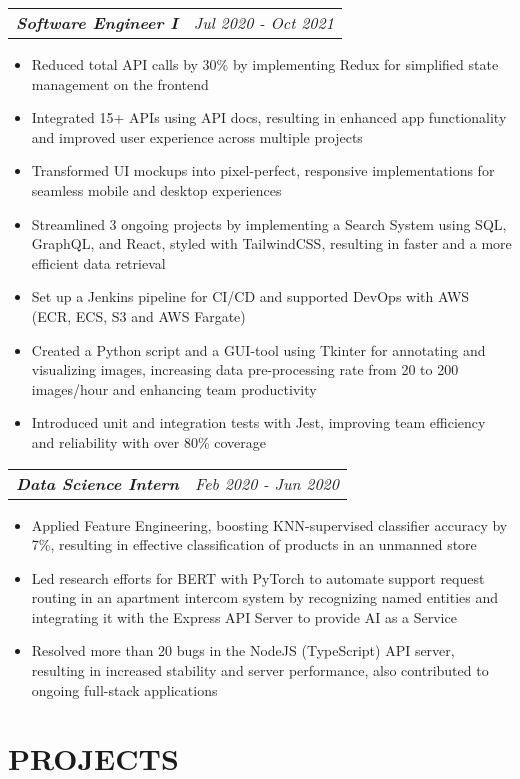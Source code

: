 \documentclass[letterpaper]{article}
\makeatletter
\newcommand{\resumeItemWithoutTitle}[1]{
  \item{
    {#1 \vspace{-4pt}}
  }
}
\newcommand{\resumeSubheadingWithoutTitle}[2]{
  \begin{tabular*}{\textwidth}{l@{\extracolsep{\fill}}r}
        \textbf{\textit{#1}} & \textit{ #2} \\
    \end{tabular*}\vspace{-15pt}
}
\newcommand{\shortSection}[1]{
    \vspace{-6pt}
    \section{#1}
}
\newcommand{\projectHeading}[4]{
  \begin{tabular*}{\textwidth}{l@{\extracolsep{\fill}}r}
        \textbf{#1} 
        \hspace{-2pt} $\vert$ \hspace{-2pt} {\textit{#2}} 
        \hspace{-2pt} $\vert$ \hspace{-2pt} \href{#3}{ \underline{Link}}
        &
        \textit{#4} \\
    \end{tabular*}\vspace{-2pt}
}
\newcommand{\resumeItemListStart}{\begin{itemize}}
\newcommand{\resumeItemListEnd}{\end{itemize}}
\makeatother
\begin{document}
\vspace{2pt}
\resumeSubheadingWithoutTitle
{Software Engineer I}{Jul 2020 - Oct 2021}
\vspace{0pt}
\resumeItemListStart
\resumeItemWithoutTitle{Reduced total API calls by 30\% by implementing Redux for simplified state management on the frontend}
\resumeItemWithoutTitle{Integrated 15+ APIs using API docs, resulting in enhanced app functionality and improved user experience across multiple projects}
\resumeItemWithoutTitle{Transformed UI mockups into pixel-perfect, responsive implementations for seamless mobile and desktop experiences}
\resumeItemWithoutTitle{Streamlined 3 ongoing projects by implementing a Search System using SQL, GraphQL, and React, styled with TailwindCSS, resulting in faster and a more efficient data retrieval}
\resumeItemWithoutTitle{Set up a Jenkins pipeline for CI/CD and supported DevOps with AWS (ECR, ECS, S3 and AWS Fargate)}
\resumeItemWithoutTitle{Created a Python script and a GUI-tool using Tkinter for annotating and visualizing images, increasing data pre-processing rate from 20 to 200 images/hour and enhancing team productivity}
\resumeItemWithoutTitle{Introduced unit and integration tests with Jest, improving team efficiency and reliability with over 80\% coverage}
\resumeItemListEnd

\vspace{2pt}
\resumeSubheadingWithoutTitle
{Data Science Intern}{Feb 2020 - Jun 2020}
\vspace{0pt}
\resumeItemListStart
\resumeItemWithoutTitle{Applied Feature Engineering, boosting KNN-supervised classifier accuracy by 7\%, resulting in effective classification of products in an unmanned store}
\resumeItemWithoutTitle{Led research efforts for BERT with PyTorch to automate support request routing in an apartment intercom system by recognizing named entities and integrating it with the Express API Server to provide AI as a Service}
\resumeItemWithoutTitle{Resolved more than 20 bugs in the NodeJS (TypeScript) API server, resulting in increased stability and server performance, also contributed to ongoing full-stack applications}
\resumeItemListEnd


\shortSection{PROJECTS}
\end{document}
